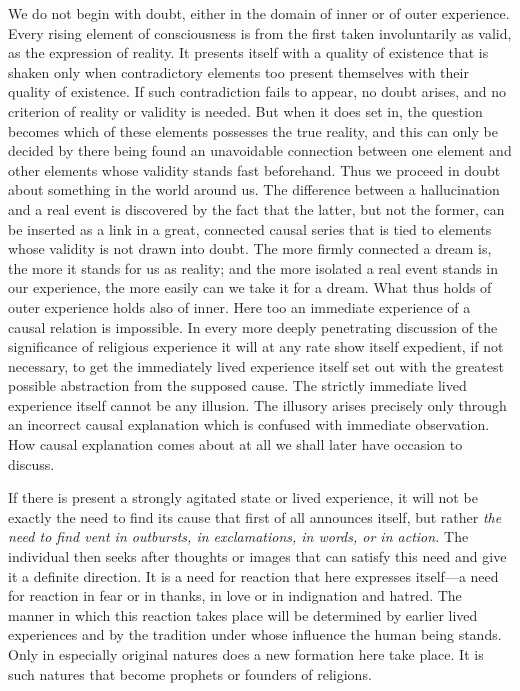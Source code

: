 \documentclass[12pt,a4paper]{book}
\newcommand{\opage}[1]{\marginnote{\footnotesize\textit{[#1]}}}
\begin{document}
We do not begin with doubt, either in the domain of inner or of outer
experience. Every rising element of consciousness is from the first taken
involuntarily as valid, as the expression of reality. It presents itself with a
quality of existence that is shaken only when contradictory elements too
present themselves with their quality of existence. If such contradiction fails
to appear, no doubt arises, and no criterion of reality or validity is needed.
But when it does set in, the question becomes which of these elements possesses
the true reality, and this can only be decided by there being found an
unavoidable connection between one element and other elements whose validity
stands fast beforehand. Thus we proceed in doubt about something in the world
around us. The difference between a hallucination and a real event is
discovered by the fact that the latter, but not the former, can be inserted as
a link in a great, connected causal series that is tied to elements whose
validity is not 
\opage{58}drawn into doubt. The more firmly connected a dream is, the
more it stands for us as reality; and the more isolated a real event stands in
our experience, the more easily can we take it for a dream. What thus holds of
outer experience holds also of inner. Here too an immediate experience of a
causal relation is impossible. In every more deeply penetrating discussion of
the significance of religious experience it will at any rate show itself
expedient, if not necessary, to get the immediately lived experience itself set
out with the greatest possible abstraction from the supposed cause. The
strictly immediate lived experience itself cannot be any illusion. The
illusory arises precisely only through an incorrect causal explanation which is
confused with immediate observation. How causal explanation comes about at all
we shall later have occasion to discuss.

If there is present a strongly agitated state or lived experience, it will not
be exactly the need to find its cause that first of all announces itself, but
rather \emph{the need to find vent in outbursts, in exclamations, in words, or
in action.} The individual then seeks after thoughts or images that can satisfy
this need and give it a definite direction. It is a need for reaction that here
expresses itself---a need for reaction in fear or in thanks, in love or in
indignation and hatred. The manner in which this reaction takes place will be
determined by earlier lived experiences and by the tradition under whose
influence the human being stands. Only in especially original natures does a
new formation here take place. It is such natures that become prophets or
founders of religions.
\end{document}
